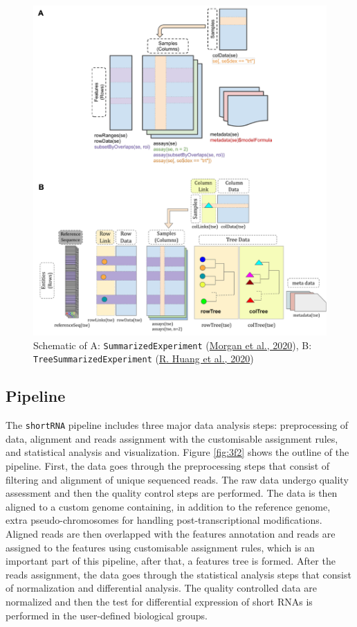 \documentclass[12pt,twoside]{reedthesis}
\begin{document}
\begin{figure}[htbp]

{\centering \includegraphics{thesis_files/figure-latex/3f1-1} 

}

\caption{Schematic of A: \texttt{SummarizedExperiment} (\protect\hyperlink{ref-morgan2020}{Morgan et al., 2020}), B: \texttt{TreeSummarizedExperiment} (\protect\hyperlink{ref-huang2020}{R. Huang et al., 2020})}\label{fig:3f1}
\end{figure}
\hypertarget{pipeline}{%
\subsection{Pipeline}\label{pipeline}}

The \texttt{shortRNA} pipeline includes three major data analysis steps:
preprocessing of data, alignment and reads assignment with the
customisable assignment rules, and statistical analysis and
visualization. Figure \ref{fig:3f2} shows the outline of the pipeline. First, the
data goes through the preprocessing steps that consist of filtering and
alignment of unique sequenced reads. The raw data undergo quality
assessment and then the quality control steps are performed. The data is
then aligned to a custom genome containing, in addition to the reference
genome, extra pseudo-chromosomes for handling post-transcriptional
modifications. Aligned reads are then overlapped with the features
annotation and reads are assigned to the features using customisable
assignment rules, which is an important part of this pipeline, after
that, a features tree is formed. After the reads assignment, the data
goes through the statistical analysis steps that consist of
normalization and differential analysis. The quality controlled data are
normalized and then the test for differential expression of short RNAs
is performed in the user-defined biological groups.
\end{document}
